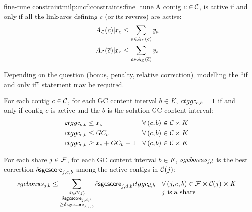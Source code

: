 \begin{definition}{\MGC{} fine-tune constraint}{milp:mcf:constraints:fine_tune}
  A contig \(c \in \mathcal{C}{}\), is active if and only if all the link-arcs defining \(c\) (or its reverse) are active:
  \begin{align}
    |A_{\mathcal{L}}{}(c)|x_c & \leq \sum_{a \in A_{\mathcal{L}}{}(c)} y_a \\
    |A_{\mathcal{L}}{}(\overline{c})|x_c & \leq \sum_{a \in A_{\mathcal{L}}{}(\overline{c})} y_a
  \end{align}

  \begin{questionbox}
    Depending on the question (bonus, penalty, relative correction), modelling the \enquote{if and only if} statement may be required.
  \end{questionbox}

  For each contig \(c \in \mathcal{C}{}\), for each GC content interval \(b \in K\), \(ctggc_{c,b} = 1\) if and only if contig \(c\) is active and the \(b\) is the solution GC content interval:
  \begin{align}
    \ctggc{c}{b} & \leq x_c & \forall (c, b) \in \Contigs{} \times K \\
    \ctggc{c}{b} & \leq GC_b & \forall (c, b) \in \Contigs{} \times K \\
    \ctggc{c}{b} & \geq x_c + GC_b - 1 & \forall (c, b) \in \Contigs{} \times K
  \end{align}

  For each share \(j \in \mathcal{F}{}\), for each GC content interval \(b \in K\), \(sgcbonus_{j, b}\) is the best correction \(\mathsf{\delta sgcscore}_{j, c, b}\) among the active contigs in \(\mathcal{C}(j)\):
  \begin{equation}
    \sgcbonus{j}{b} \leq \sum_{\substack{
        d \in \Contigs(j) \\ \dsgcscore{j}{d}{b} \\ \geq \dsgcscore{j}{c}{b}
    }} \dsgcscore{j}{d}{b} \ctggc{d}{b} \quad
    \begin{array}[t]{@{}l@{}}
      \forall (j, c, b) \in \Fragments{} \times \Contigs{}(j) \times K \\
      j \text{ is a share}
    \end{array}
  \end{equation}

\end{definition}

